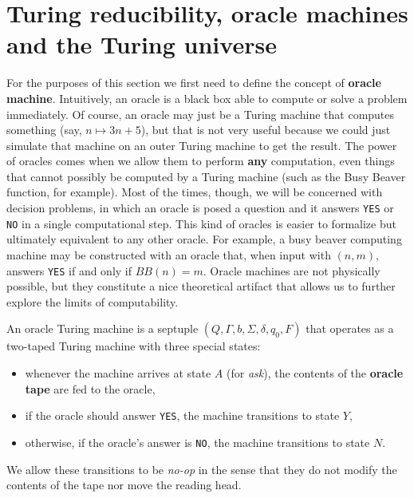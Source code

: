 \documentclass[../main.tex]{memoir}
\begin{document}
\section{Turing reducibility, oracle machines and the Turing universe}

For the purposes of this section we first need to define the concept of \textbf{oracle machine}. Intuitively, an oracle is a black box able to compute or solve a problem immediately. Of course, an oracle may just be a Turing machine that computes something (say, $n \mapsto 3n + 5$), but that is not very useful because we could just simulate that machine on an outer Turing machine to get the result. The power of oracles comes when we allow them to perform \textbf{any} computation, even things that cannot possibly be computed by a Turing machine (such as the Busy Beaver function, for example). Most of the times, though, we will be concerned with decision problems, in which an oracle is posed a question and it answers \texttt{YES} or \texttt{NO} in a single computational step. This kind of oracles is easier to formalize but ultimately equivalent to any other oracle. For example, a busy beaver computing machine may be constructed with an oracle that, when input with $(n, m)$, answers \texttt{YES} if and only if $BB(n) = m$. Oracle machines are not physically possible, but they constitute a nice theoretical artifact that allows us to further explore the limits of computability.

\begin{definition}
  \label{def:oracle-turing-machine}
  An oracle Turing machine is a septuple $(Q, \Gamma, b, \Sigma, \delta, q_0, F)$ that operates as a two-taped Turing machine with three special states:

  \begin{itemize}
  \item whenever the machine arrives at state $A$ (for \textit{ask}), the contents of the \textbf{oracle tape} are fed to the oracle,
  \item if the oracle should answer \texttt{YES}, the machine transitions to state $Y$,
  \item otherwise, if the oracle's answer is \texttt{NO}, the machine transitions to state $N$.
  \end{itemize}

  We allow these transitions to be \textit{no-op} in the sense that they do not modify the contents of the tape nor move the reading head.
\end{definition}
\end{document}
